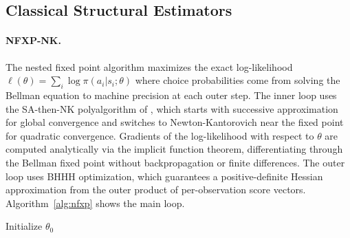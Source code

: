 \begin{table}[H]
\centering
\caption{Empirical recovery on the shape-shifter synthetic DGP (Tier~4 of the JSS deep-run matrix). A check mark indicates the cell met the acceptance criterion in \texttt{plans/plan\_shapeshifter.md}; \texttt{na} indicates the cell was not run because the source paper does not claim support; a cross indicates a documented failure with the failure mode recorded in the per-cell artifact CSV. The table is generated by \texttt{experiments/jss\_deep\_run/emit\_capability\_table.py} from the aggregated Tier~4 results and refreshed automatically after each run.}
\label{tab:capability_empirical}
\footnotesize

\end{table}


\subsection{Classical Structural Estimators}

\paragraph{NFXP-NK.}
The nested fixed point algorithm maximizes the exact log-likelihood $\ell(\theta) = \sum_i \log \pi(a_i | s_i; \theta)$ where choice probabilities come from solving the Bellman equation to machine precision at each outer step.
The inner loop uses the SA-then-NK polyalgorithm of \citet{iskhakov2016}, which starts with successive approximation for global convergence and switches to Newton-Kantorovich near the fixed point for quadratic convergence.
Gradients of the log-likelihood with respect to $\theta$ are computed analytically via the implicit function theorem, differentiating through the Bellman fixed point without backpropagation or finite differences.
The outer loop uses BHHH optimization, which guarantees a positive-definite Hessian approximation from the outer product of per-observation score vectors.
Algorithm~\ref{alg:nfxp} shows the main loop.

\begin{algorithm}[H]
\DontPrintSemicolon
\caption{NFXP-NK \citep{rust1987, iskhakov2016}}
\label{alg:nfxp}
Initialize $\theta_0$\;
\end{algorithm}


